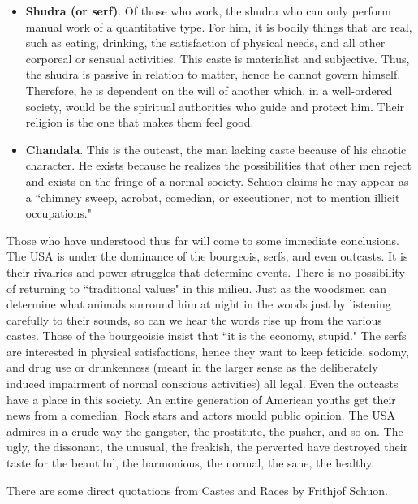 \begin{itemize}
\item \textbf{Shudra (or serf)}. Of those who work, the shudra who can only perform manual work of a quantitative type. For him, it is bodily things that are real, such as eating, drinking, the satisfaction of physical needs, and all other corporeal or sensual activities. This caste is materialist and subjective. Thus, the shudra is passive in relation to matter, hence he cannot govern himself. Therefore, he is dependent on the will of another which, in a well-ordered society, would be the spiritual authorities who guide and protect him. Their religion is the one that makes them feel good. 
\item \textbf{Chandala}. This is the outcast, the man lacking caste because of his chaotic character. He exists because he realizes the possibilities that other men reject and exists on the fringe of a normal society. Schuon claims he may appear as a ``chimney sweep, acrobat, comedian, or executioner, not to mention illicit occupations." 
\end{itemize}
Those who have understood thus far will come to some immediate conclusions. The USA is under the dominance of the bourgeois, serfs, and even outcasts. It is their rivalries and power struggles that determine events. There is no possibility of returning to ``traditional values" in this milieu. Just as the woodsmen can determine what animals surround him at night in the woods just by listening carefully to their sounds, so can we hear the words rise up from the various castes. Those of the bourgeoisie insist that ``it is the economy, stupid." The serfs are interested in physical satisfactions, hence they want to keep feticide, sodomy, and drug use or drunkenness (meant in the larger sense as the deliberately induced impairment of normal conscious activities) all legal. Even the outcasts have a place in this society. An entire generation of American youths get their news from a comedian. Rock stars and actors mould public opinion. The USA admires in a crude way the gangster, the prostitute, the pusher, and so on. The ugly, the dissonant, the unusual, the freakish, the perverted have destroyed their taste for the beautiful, the harmonious, the normal, the sane, the healthy.

There are some direct quotations from Castes and Races by Frithjof Schuon.




